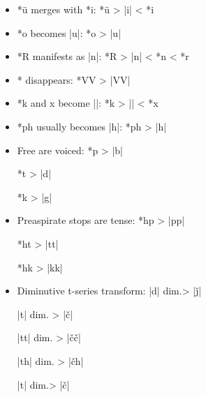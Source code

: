 \documentclass[output=paper]{LSP/langsci}
\begin{document}
\begin{itemize}
\item {} *\"u merges with *i: \hspace{1em} *\"u	>	|i|	<	*i
\item *o becomes |u|: \hspace{6em} *o	>	|u|
\item *R manifests as |n|: \hspace{4.2em} *R	>	|n|	<	*n < *r
\item *\textsuperscript{} disappears: \hspace{6.2em} *V\textsuperscript{}V	>	|VV|
\item *k\textsuperscript{} and x\textsuperscript{} become |\textsuperscript{}|:	\hspace{3.2em} *k\textsuperscript{}	>	|\textsuperscript{}|	<	*x\textsuperscript{}
\item *ph usually becomes |h|: \hspace{2.2em} *ph	>	|h|

\item Free  are voiced:	\hspace{1em}*p	>	|b|

\hspace{13em} *t	>	|d|

\hspace{13em}*k	>	|g|

\item Preaspirate stops are tense: \hspace{1em} *hp	>	|pp|

\hspace{12.5em} *ht	>	|tt|
					
\hspace{12.5em} *hk	>	|kk|

\item Diminutive t-series transform:	\hspace{1.1em} |d|	dim.>	|\v{j}|

\hspace{14em} |t|	dim. >	|\v{c}|
					
\hspace{14em} |tt|	dim. >	|\v{c}\v{c}|

\hspace{14em} |th|	dim. >	|\v{c}h|

\hspace{14em} |t\textsuperscript{}|	dim.>	|\v{c}\textsuperscript{}|
\end{itemize}
\end{document}
